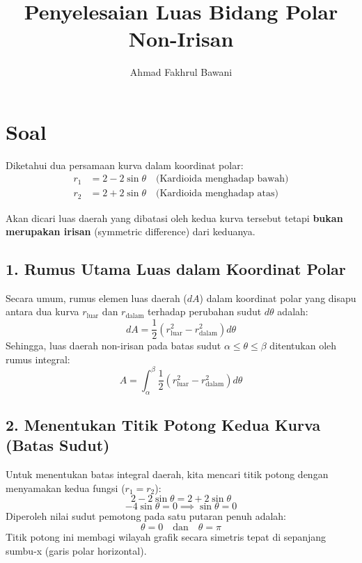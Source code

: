 \documentclass[12pt,a4paper]{article}
\title{Penyelesaian Luas Bidang Polar Non-Irisan}
\author{Ahmad Fakhrul Bawani}
\date{}
\begin{document}
\maketitle

\section*{Soal}
Diketahui dua persamaan kurva dalam koordinat polar:
\begin{align*}
  r_1 &= 2 - 2\sin\theta \quad \text{(Kardioida menghadap bawah)} \\
  r_2 &= 2 + 2\sin\theta \quad \text{(Kardioida menghadap atas)}
\end{align*}

Akan dicari luas daerah yang dibatasi oleh kedua kurva tersebut tetapi \textbf{bukan merupakan irisan} (symmetric difference) dari keduanya.

\subsection*{1. Rumus Utama Luas dalam Koordinat Polar}
Secara umum, rumus elemen luas daerah ($dA$) dalam koordinat polar yang disapu antara dua kurva $r_{\text{luar}}$ dan $r_{\text{dalam}}$ terhadap perubahan sudut $d\theta$ adalah:
\[
dA = \frac{1}{2} \left( r_{\text{luar}}^2 - r_{\text{dalam}}^2 \right) d\theta
\]
Sehingga, luas daerah non-irisan pada batas sudut $\alpha \le \theta \le \beta$ ditentukan oleh rumus integral:
\[
A = \int_{\alpha}^{\beta} \frac{1}{2} \left( r_{\text{luar}}^2 - r_{\text{dalam}}^2 \right) d\theta
\]

\subsection*{2. Menentukan Titik Potong Kedua Kurva (Batas Sudut)}
Untuk menentukan batas integral daerah, kita mencari titik potong dengan menyamakan kedua fungsi ($r_1 = r_2$):
\[
2 - 2\sin\theta = 2 + 2\sin\theta
\]
\[
-4\sin\theta = 0 \implies \sin\theta = 0
\]
Diperoleh nilai sudut pemotong pada satu putaran penuh adalah:
\[
\theta = 0 \quad \text{dan} \quad \theta = \pi
\]
Titik potong ini membagi wilayah grafik secara simetris tepat di sepanjang sumbu-x (garis polar horizontal).
\end{document}
